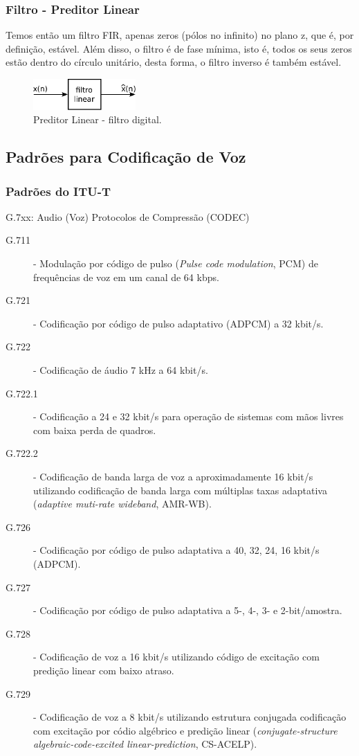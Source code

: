 \begin{frame}
  \frametitle{Filtro - Preditor Linear}
  Temos então um filtro FIR, apenas zeros (pólos no infinito) no plano z,
  que é, por definição, estável. Além disso, o filtro é de fase mínima,
  isto é, todos os seus zeros estão dentro do círculo unitário, desta forma,
  o filtro inverso é também estável.

  \begin{figure}[ht]
    \centering
    \includegraphics[width=0.35\textwidth]{images/filtro_preditor_linear.pdf}
    \caption{Preditor Linear - filtro digital.}
    \label{fig:fpl}
  \end{figure}
\end{frame}


\subsection{Padrões para Codificação de Voz}
\begin{frame}[allowframebreaks]
  \frametitle{Padrões do ITU-T}
  G.7xx: Audio (Voz) Protocolos de Compressão (CODEC)
  \begin{description}
  \item[G.711] - Modulação por código de pulso (\emph{Pulse code modulation}, PCM) de frequências de voz em um canal de 64 kbps.
  \item[G.721] - Codificação por código de pulso adaptativo (ADPCM) a 32 kbit/s.
  \item[G.722] - Codificação de áudio 7 kHz a 64 kbit/s.
  \item[G.722.1] - Codificação a 24 e 32 kbit/s para operação de sistemas com mãos livres com baixa perda de quadros.
  \item[G.722.2] - Codificação de banda larga de voz a aproximadamente 16 kbit/s utilizando codificação de banda larga com múltiplas taxas adaptativa (\emph{adaptive muti-rate wideband}, AMR-WB).
  \item[G.726] - Codificação por código de pulso adaptativa a 40, 32, 24, 16 kbit/s (ADPCM).
  \item[G.727] - Codificação por código de pulso adaptativa a 5-, 4-, 3- e 2-bit/amostra.
  \item[G.728] - Codificação de voz a 16 kbit/s utilizando código de excitação com predição linear com baixo atraso.
  \item[G.729] - Codificação de voz a 8 kbit/s utilizando estrutura conjugada codificação com excitação por códio algébrico e predição linear (\emph{conjugate-structure algebraic-code-excited linear-prediction}, CS-ACELP).
  \end{description}
\end{frame}


